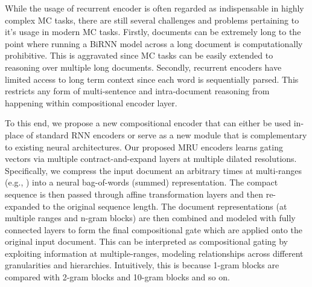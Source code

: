 \documentclass{article}
\begin{document}
While the usage of recurrent encoder is often regarded as indispensable in highly complex MC tasks, there are still several challenges and problems pertaining to it's usage in modern MC tasks. Firstly, documents can be extremely long to the point where running a BiRNN model across a long document is computationally prohibitive. This is aggravated since MC tasks can be easily extended to reasoning over multiple long documents. Secondly, recurrent encoders have limited access to long term context since each word is sequentially parsed. This restricts any form of multi-sentence and intra-document reasoning from happening within compositional encoder layer. 

To this end, we propose a new compositional encoder that can either be used in-place of standard RNN encoders or serve as a new module that is complementary to existing neural architectures. Our proposed \textsc{MRU} encoders learns gating vectors via multiple contract-and-expand layers at multiple dilated resolutions. Specifically, we compress the input document an arbitrary  times at multi-ranges (e.g., ) into a neural bag-of-words (summed) representation. The compact sequence is then passed through affine transformation layers and then re-expanded to the original sequence length. The  document representations (at multiple ranges and n-gram blocks) are then combined and modeled with fully connected layers to form the final compositional gate which are applied onto the original input document. This can be interpreted as compositional gating by exploiting information at multiple-ranges, modeling relationships across different granularities and hierarchies. Intuitively, this is because 1-gram blocks are compared with 2-gram blocks and 10-gram blocks and so on.
\end{document}
